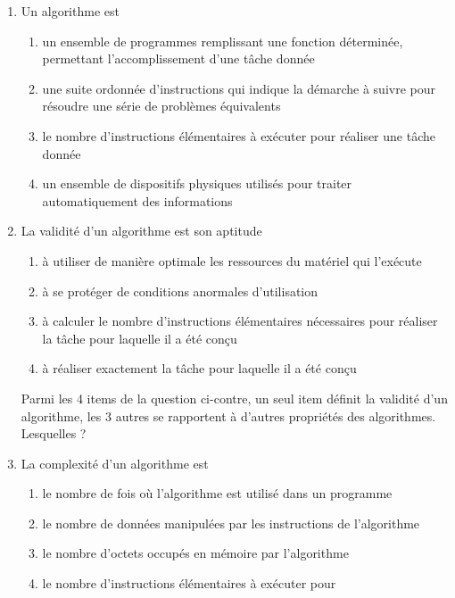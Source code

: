 \begin{td}[QCM (1)]
\begin{enumerate}
\item Un algorithme est
	\begin{enumerate}
	\item un ensemble de programmes remplissant une fonction déterminée,
		permettant l'accomplissement d'une tâche donnée
	\item une suite ordonnée d'instructions qui indique la démarche 
		à suivre pour résoudre une série de problèmes équivalents
	\item le nombre d'instructions élémentaires à exécuter pour
		réaliser une tâche donnée
	\item un ensemble de dispositifs physiques utilisés pour traiter
		automatiquement des informations
	\end{enumerate}
\newpage
\item La validité d'un algorithme est son aptitude
	\begin{enumerate}
	\item à utiliser de manière optimale les ressources du matériel qui l'exécute
	\item à se protéger de conditions anormales d'utilisation
	\item à calculer le nombre d'instructions élémentaires nécessaires pour
		réaliser la tâche pour laquelle il a été conçu
	\item à réaliser exactement la tâche pour laquelle il a été conçu
	\end{enumerate}
	\begin{rem} Parmi les 4 items de la question ci-contre, un seul item définit
	la validité d'un algorithme, les 3 autres se rapportent à d'autres propriétés
	des algorithmes. Lesquelles ?
	\end{rem}
\item La complexité d'un algorithme est
	\begin{enumerate}
	\item le nombre de fois où l'algorithme est utilisé dans un programme
	\item le nombre de données manipulées par les instructions de
		l'algorithme
	\item le nombre d'octets occupés en mémoire par l'algorithme
	\item le nombre d'instructions élémentaires à exécuter pour

\end{enumerate}
\end{enumerate}
\end{td}
